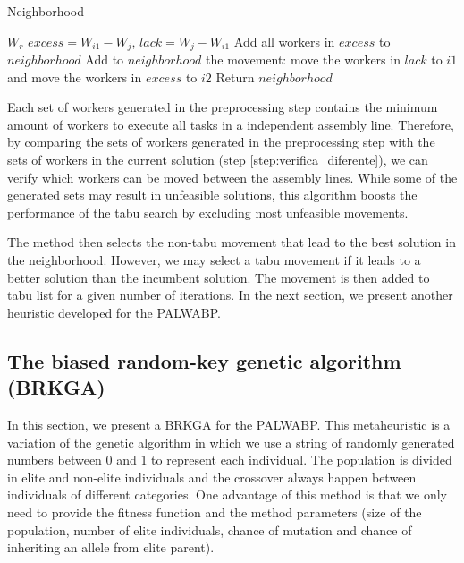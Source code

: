 \documentclass{singlecol-new}
\begin{document}
\begin{algorithm}[!ht]
\caption{Neighborhood}
\label{alg:vizinhanca1}
\begin{algorithmic}[1]
\REQUIRE $W_r$
		\STATE $excess = W_{i1}-W_j$, $lack = W_j-W_{i1}$
		\label{step:verifica_diferente}
				\STATE Add all workers in $excess$ to $neighborhood$\label{step:movimento_simples}
			\ELSE
						\STATE Add to $neighborhood$ the movement: move the workers in $lack$ to $i1$ and move the workers in $excess$ to $i2$\label{step:movimento_troca}
					\ENDIF
				\ENDFOR
			\ENDIF
		\ENDIF
	\ENDFOR
\ENDFOR
\STATE Return $neighborhood$
\end{algorithmic}
\end{algorithm}

Each set of workers generated in the preprocessing step contains the minimum amount of workers to execute all tasks in a independent assembly line. Therefore, by comparing the sets of workers generated in the preprocessing step with the sets of workers in the current solution (step \ref{step:verifica_diferente}), we can verify which workers can be moved between the assembly lines. While some of the generated sets may result in unfeasible solutions, this algorithm boosts the performance of the tabu search by excluding most unfeasible movements.

The method then selects the non-tabu movement that lead to the best solution in the neighborhood. However, we may select a tabu movement if it leads to a better solution than the incumbent solution. The movement is then added to tabu list for a given number of iterations. In the next section, we present another heuristic developed for the PALWABP.

\subsection{The biased random-key genetic algorithm (BRKGA)}\label{brkga}

In this section, we present a BRKGA for the PALWABP. This metaheuristic is a variation of the genetic algorithm in which we use a string of randomly generated numbers between 0 and 1 to represent each individual. The population is divided in elite and non-elite individuals and the crossover always happen between individuals of different categories. One advantage of this method is that we only need to provide the fitness function and the method parameters (size of the population, number of elite individuals, chance of mutation and chance of inheriting an allele from elite parent).
\end{document}
